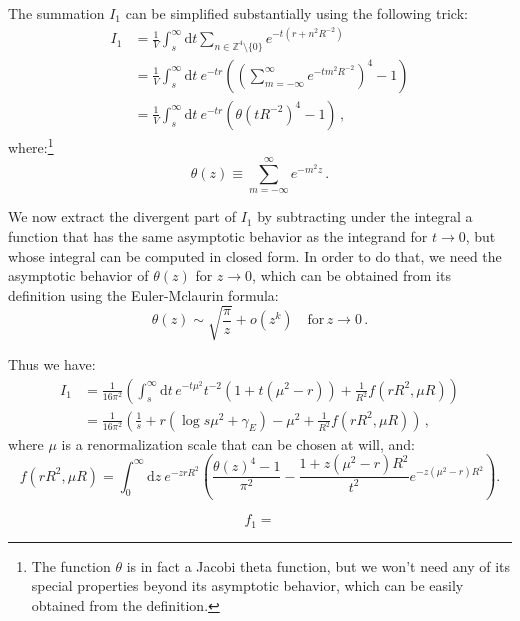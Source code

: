 \documentclass[11pt,a4paper]{article}
\newcommand{\dd}{\mathrm{d}}
\begin{document}
The summation $I_1$ can be simplified substantially using the following trick:
\begin{equation}
\begin{split}
    I_1 &= \frac{1}{V} \int_{s}^{\infty} \dd t \sum_{n\in\mathbb{Z}^4\setminus\{0\}} 
    e^{-t(r + n^2 R^{-2})}\\
    & = \frac{1}{V} \int_{s}^{\infty} \dd t\ e^{-t r}
        \left(\left(\sum_{m = -\infty}^{\infty} e^{-t m^2 R^{-2}}\right)^4 - 1\right) \\
    & = \frac{1}{V} \int_{s}^{\infty} \dd t\ e^{-t r}
        \left(\theta\!\left(t R^{-2}\right)^4 - 1\right)\,,
\end{split}
\end{equation}
where:\footnote{The function $\theta$ is in fact a Jacobi theta function, but we
won't need any of its special properties beyond its asymptotic behavior, which
can be easily obtained from the definition.}
\begin{equation}
    \theta(z) \equiv \sum_{m = -\infty}^{\infty} e^{-m^2 z}\,.
\end{equation}

We now extract the divergent part of $I_1$ by subtracting under the integral a
function that has the same asymptotic behavior as the integrand for $t \to 0$,
but whose integral can be computed in closed form. In order to do that, we need
the asymptotic behavior of $\theta(z)$ for $z\to0$, which can be obtained from
its definition using the Euler-Mclaurin formula:
\begin{equation}
    \theta(z) \sim \sqrt{\frac{\pi}{z}} + o(z^k) \quad\mathrm{for}\, z\to0\,.
\end{equation}

Thus we have:
\begin{equation}
\begin{split}
    I_1 &= \frac{1}{16\pi^2}\left(\int_{s}^{\infty}\dd t\, e^{-t \mu^2} t^{-2}\left(1 + t (\mu^2 - r)\right)
    +\frac{1}{R^2} f(r R^2, \mu R)\right)\\
    &= \frac{1}{16\pi^2}\left(\frac{1}{s} + r\left(\log s\mu^2 + \gamma_{E}\right) - 
    \mu^2 +\frac{1}{R^2} f(r R^2, \mu R)\right)\,,
\end{split}
\end{equation}
where $\mu$ is a renormalization scale that can be chosen at will, and:
\begin{equation}
    f(rR^2,\mu R) = \int_{0}^{\infty} \dd z\ e^{-z r R^2} \left(\frac{\theta(z)^4 - 1}{\pi^2} - 
    \frac{1 + z\left(\mu^2 - r\right)R^2}{t^2}e^{-z\left(\mu^2 - r\right)R^2}\right).
\end{equation}


\begin{equation}
\label{eq:f_functions}
f_1 = 
\end{equation}
\end{document}
